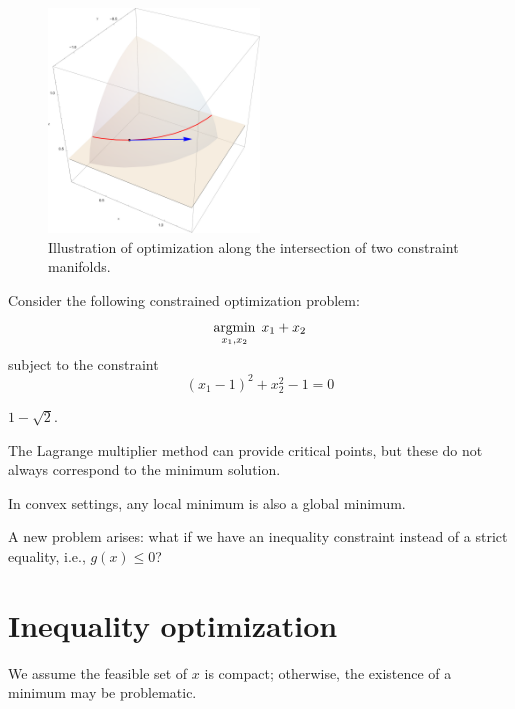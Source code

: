 \documentclass[../main]{subfiles}
\begin{document}
\begin{figure}[h]
    \centering
    \includegraphics[width=0.5\textwidth]{../../fig/fig2.pdf}
    \caption{Illustration of optimization along the intersection of two constraint manifolds.}
    \label{3-1-2}
\end{figure}

\begin{example}
    Consider the following constrained optimization problem:
    \begin{equation}
        \mathop{\mathrm{argmin}}_{x_1, x_2} \; x_1 + x_2
    \end{equation}
    subject to the constraint
    \begin{equation}
        (x_1 - 1)^2 + x_2^2 - 1 = 0
    \end{equation}
\end{example}
\begin{solution}
    $1-\sqrt{2}$.
\end{solution}

\begin{note}
    The Lagrange multiplier method can provide critical points, but these do not always correspond to the minimum solution.
\end{note}

\begin{note}
    In convex settings, any local minimum is also a global minimum.
\end{note}
\vspace{0.5em}
A new problem arises: what if we have an inequality constraint instead of a strict equality, i.e., $g(x) \leq 0$?

\section{Inequality optimization}
    We assume the feasible set of $x$ is compact; otherwise, the existence of a minimum may be problematic.
\end{document}
